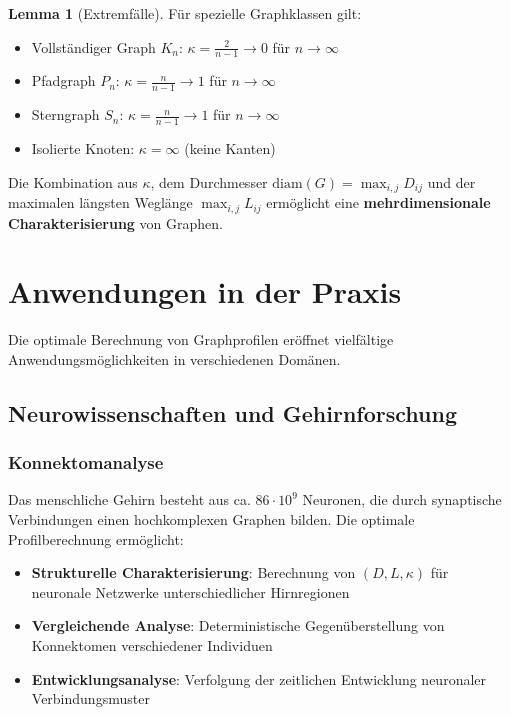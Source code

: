 ﻿\documentclass[a4paper,12pt]{article}
\theoremstyle{definition}
\newtheorem{lemma}{Lemma}
\begin{document}
	\begin{lemma}[Extremfälle]
		Für spezielle Graphklassen gilt:
		\begin{itemize}
			\item[-] Vollständiger Graph $K_n$: $\kappa = \frac{2}{n-1} \to 0$ für $n \to \infty$
			\item[-] Pfadgraph $P_n$: $\kappa = \frac{n}{n-1} \to 1$ für $n \to \infty$
			\item[-] Sterngraph $S_n$: $\kappa = \frac{n}{n-1} \to 1$ für $n \to \infty$
			\item[-] Isolierte Knoten: $\kappa = \infty$ (keine Kanten)
		\end{itemize}
	\end{lemma}
	
	Die Kombination aus $\kappa$, dem Durchmesser $\text{diam}(G) = \max_{i,j} D_{ij}$ und der maximalen längsten Weglänge $\max_{i,j} L_{ij}$ ermöglicht eine \textbf{mehrdimensionale Charakterisierung} von Graphen.
	
	\section{Anwendungen in der Praxis}
	
	Die optimale Berechnung von Graphprofilen eröffnet vielfältige Anwendungsmöglichkeiten in verschiedenen Domänen.
	
	\subsection{Neurowissenschaften und Gehirnforschung}
	
	\subsubsection{Konnektomanalyse}
	
	Das menschliche Gehirn besteht aus ca. $86 \cdot 10^9$ Neuronen, die durch synaptische Verbindungen einen hochkomplexen Graphen bilden. Die optimale Profilberechnung ermöglicht:
	
	\begin{itemize}
		\item[-] \textbf{Strukturelle Charakterisierung}: Berechnung von $(D, L, \kappa)$ für neuronale Netzwerke unterschiedlicher Hirnregionen
		\item[-] \textbf{Vergleichende Analyse}: Deterministische Gegenüberstellung von Konnektomen verschiedener Individuen
		\item[-] \textbf{Entwicklungsanalyse}: Verfolgung der zeitlichen Entwicklung neuronaler Verbindungsmuster
	\end{itemize}
	
\end{document}
